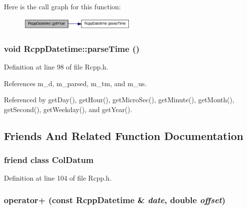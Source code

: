 Here is the call graph for this function:\nopagebreak
\begin{figure}[H]
\begin{center}
\leavevmode
\includegraphics[width=164pt]{classRcppDatetime_aba930a8d7d575eb10444258a442027cf_cgraph}
\end{center}
\end{figure}
\hypertarget{classRcppDatetime_aa4b2eba45c4c02b5d334dd89e080b660}{
\subsubsection[{parseTime}]{\setlength{\rightskip}{0pt plus 5cm}void RcppDatetime::parseTime ()}}
\label{classRcppDatetime_aa4b2eba45c4c02b5d334dd89e080b660}


Definition at line 98 of file Rcpp.h.

References m\_\-d, m\_\-parsed, m\_\-tm, and m\_\-us.

Referenced by getDay(), getHour(), getMicroSec(), getMinute(), getMonth(), getSecond(), getWeekday(), and getYear().

\subsection{Friends And Related Function Documentation}
\hypertarget{classRcppDatetime_a2740dcf7de2c2f5471d8fa18944a98d7}{
\subsubsection[{ColDatum}]{\setlength{\rightskip}{0pt plus 5cm}friend class {\bf ColDatum}}}
\label{classRcppDatetime_a2740dcf7de2c2f5471d8fa18944a98d7}


Definition at line 104 of file Rcpp.h.\hypertarget{classRcppDatetime_a29513e04f8cb90b2a7efea97f8cbd37a}{
\subsubsection[{operator+}]{ operator+ (const {\bf RcppDatetime} \& {\em date}, \/  double {\em offset})}}
\label{classRcppDatetime_a29513e04f8cb90b2a7efea97f8cbd37a}


